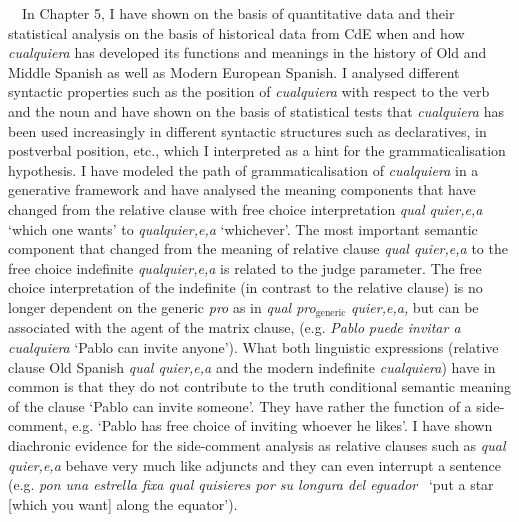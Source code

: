 \documentclass[10pt]{article}
\newcommand\textsubscript[1]{\ensuremath{{}_{\text{#1}}}}
\newenvironment{styleStandard}{\renewcommand\baselinestretch{1.25}\setlength\leftskip{0cm}\setlength\rightskip{0cm}\setlength\parindent{0cm}\setlength\parfillskip{0pt plus 1fil}\setlength\parskip{0in plus 1pt}\writerlistparindent\writerlistleftskip\leavevmode\normalfont\normalsize\fontsize{12pt}{14.4pt}\selectfont\writerlistlabel\ignorespaces}{\unskip\vspace{0in plus 1pt}\par}
\newcommand\writerlistleftskip{}
\newcommand\writerlistparindent{}
\newcommand\writerlistlabel{}
\begin{document}
\begin{styleStandard}
\ \ In Chapter 5, I have shown on the basis of quantitative data and their statistical analysis on the basis of historical data from CdE when and how \textit{cualquiera} has developed its functions and meanings in the history of Old and Middle Spanish as well as Modern European Spanish. I analysed different syntactic properties such as the position of \textit{cualquiera} with respect to the verb and the noun and have shown on the basis of statistical tests that \textit{cualquiera} has been used increasingly in different syntactic structures such as declaratives, in postverbal position, etc., which I interpreted as a hint for the grammaticalisation hypothesis. I have modeled the path of grammaticalisation of \textit{cualquiera} in a generative framework and have analysed the meaning components that have changed from the relative clause with free choice interpretation \textit{qual quier,e,a} ‘which one wants’ to \textit{qualquier,e,a} ‘whichever’. The most important semantic component that changed from the meaning of relative clause \textit{qual quier,e,a} to the free choice indefinite \textit{qualquier,e,a} is related to the judge parameter. The free choice interpretation of the indefinite (in contrast to the relative clause) is no longer dependent on the generic \textit{pro} as in \textit{qual pro}\textit{\textsubscript{generic}}\textit{ quier,e,a,} but can be associated with the agent of the matrix clause, (e.g. \textit{Pablo} \textit{puede invitar a cualquiera }‘Pablo can invite anyone’). What both linguistic expressions (relative clause Old Spanish \textit{qual quier,e,a} and the modern indefinite \textit{cualquiera}) have in common is that they do not contribute to the truth conditional semantic meaning of the clause ‘Pablo can invite someone’. They have rather the function of a side-comment, e.g. ‘Pablo has free choice of inviting whoever he likes’. I have shown diachronic evidence for the side-comment analysis as relative clauses such as \textit{qual quier,e,a} behave very much like adjuncts and they can even interrupt a sentence (e.g. \textit{pon una estrella fixa qual quisieres por su longura del eguador} \ ‘put a star [which you want] along the equator’).
\end{styleStandard}
\end{document}
